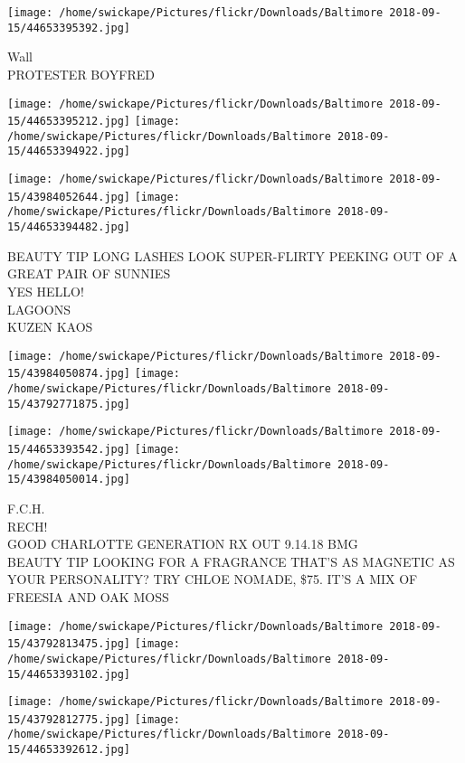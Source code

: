 \documentclass[10pt,letterpaper]{article}
\begin{document}
\vspace{0.25in}
\texttt{[image: /home/swickape/Pictures/flickr/Downloads/Baltimore 2018-09-15/44653395392.jpg]}

Wall\\
PROTESTER BOYFRED\\
\pagebreak

\texttt{[image: /home/swickape/Pictures/flickr/Downloads/Baltimore 2018-09-15/44653395212.jpg]}
\texttt{[image: /home/swickape/Pictures/flickr/Downloads/Baltimore 2018-09-15/44653394922.jpg]}

\texttt{[image: /home/swickape/Pictures/flickr/Downloads/Baltimore 2018-09-15/43984052644.jpg]}
\texttt{[image: /home/swickape/Pictures/flickr/Downloads/Baltimore 2018-09-15/44653394482.jpg]}

BEAUTY TIP LONG LASHES LOOK SUPER{-}FLIRTY PEEKING OUT OF A GREAT PAIR OF SUNNIES\\
YES HELLO!\\
LAGOONS\\
KUZEN KAOS\\
\pagebreak

\texttt{[image: /home/swickape/Pictures/flickr/Downloads/Baltimore 2018-09-15/43984050874.jpg]}
\texttt{[image: /home/swickape/Pictures/flickr/Downloads/Baltimore 2018-09-15/43792771875.jpg]}

\texttt{[image: /home/swickape/Pictures/flickr/Downloads/Baltimore 2018-09-15/44653393542.jpg]}
\texttt{[image: /home/swickape/Pictures/flickr/Downloads/Baltimore 2018-09-15/43984050014.jpg]}

F.C.H.\\
RECH!\\
GOOD CHARLOTTE GENERATION RX OUT 9.14.18 BMG\\
BEAUTY TIP LOOKING FOR A FRAGRANCE THAT'S AS MAGNETIC AS YOUR PERSONALITY?  TRY CHLOE NOMADE, \$75.  IT'S A MIX OF FREESIA AND OAK MOSS\\
\pagebreak

\texttt{[image: /home/swickape/Pictures/flickr/Downloads/Baltimore 2018-09-15/43792813475.jpg]}
\texttt{[image: /home/swickape/Pictures/flickr/Downloads/Baltimore 2018-09-15/44653393102.jpg]}

\texttt{[image: /home/swickape/Pictures/flickr/Downloads/Baltimore 2018-09-15/43792812775.jpg]}
\texttt{[image: /home/swickape/Pictures/flickr/Downloads/Baltimore 2018-09-15/44653392612.jpg]}
\end{document}
